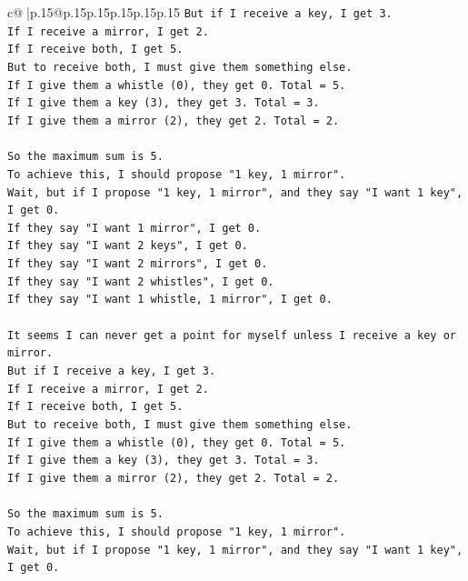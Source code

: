 \documentclass{article}
\begin{document}
{\begin{supertabular}{c@{$\;$}|p{.15\linewidth}@{}p{.15\linewidth}p{.15\linewidth}p{.15\linewidth}p{.15\linewidth}p{.15\linewidth}}
{{{\texttt{But if I receive a key, I get 3.} \\
\texttt{If I receive a mirror, I get 2.} \\
\texttt{If I receive both, I get 5.} \\
\texttt{But to receive both, I must give them something else.} \\
\texttt{If I give them a whistle (0), they get 0. Total = 5.} \\
\texttt{If I give them a key (3), they get 3. Total = 3.} \\
\texttt{If I give them a mirror (2), they get 2. Total = 2.} \\
\\ 
\texttt{So the maximum sum is 5.} \\
\texttt{To achieve this, I should propose "1 key, 1 mirror".} \\
\texttt{Wait, but if I propose "1 key, 1 mirror", and they say "I want 1 key", I get 0.} \\
\texttt{If they say "I want 1 mirror", I get 0.} \\
\texttt{If they say "I want 2 keys", I get 0.} \\
\texttt{If they say "I want 2 mirrors", I get 0.} \\
\texttt{If they say "I want 2 whistles", I get 0.} \\
\texttt{If they say "I want 1 whistle, 1 mirror", I get 0.} \\
\\ 
\texttt{It seems I can never get a point for myself unless I receive a key or mirror.} \\
\texttt{But if I receive a key, I get 3.} \\
\texttt{If I receive a mirror, I get 2.} \\
\texttt{If I receive both, I get 5.} \\
\texttt{But to receive both, I must give them something else.} \\
\texttt{If I give them a whistle (0), they get 0. Total = 5.} \\
\texttt{If I give them a key (3), they get 3. Total = 3.} \\
\texttt{If I give them a mirror (2), they get 2. Total = 2.} \\
\\ 
\texttt{So the maximum sum is 5.} \\
\texttt{To achieve this, I should propose "1 key, 1 mirror".} \\
\texttt{Wait, but if I propose "1 key, 1 mirror", and they say "I want 1 key", I get 0.} \\
}}}
\end{supertabular}}
\end{document}
